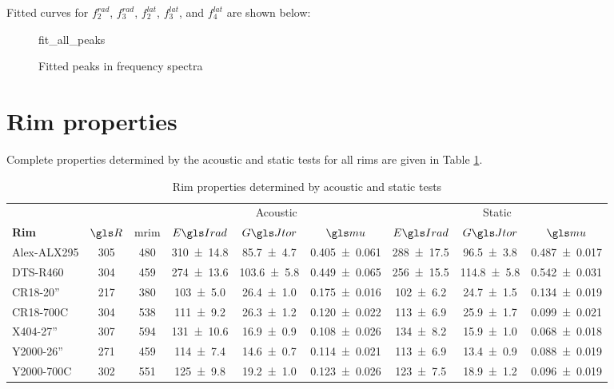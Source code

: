 \documentclass[../../thesis.tex]{subfiles}
\begin{document}
Fitted curves for $f_2^{rad}$, $f_3^{rad}$, $f_2^{lat}$, $f_3^{lat}$, and $f_4^{lat}$ are shown below:

\begin{figure}
\centering
{fit_all_peaks}
\caption{Fitted peaks in frequency spectra}
\label{fig:ema_all_peaks}
\end{figure}


\section{Rim properties}
\label{app:acoustic_properties}

Complete properties determined by the acoustic and static tests for all rims are given in Table \ref{tab:acoustic_properties}.

\begin{table}
\small
\caption{Rim properties determined by acoustic and static tests}
\label{tab:acoustic_properties}
\begin{tabular}{lcc|ccc|ccc}
\hline
&&&\multicolumn{3}{c|}{Acoustic} & \multicolumn{3}{c}{Static}\\
\bf{Rim}     & $\R$ & \gls{mrim} & $\EIr$ & $\GJ$ & $\m$ & $\EIr$ & $\GJ$ & $\m$\\
\hline
Alex-ALX295 & 305 & 480 & \num{310 +- 14.8} & \num{ 85.7 +- 4.7} & \num{0.405 +- 0.061} &
                          \num{288 +- 17.5} & \num{ 96.5 +- 3.8} & \num{0.487 +- 0.017}\\
DTS-R460    & 304 & 459 & \num{274 +- 13.6} & \num{103.6 +- 5.8} & \num{0.449 +- 0.065} &
                          \num{256 +- 15.5} & \num{114.8 +- 5.8} & \num{0.542 +- 0.031}\\
CR18-20''   & 217 & 380 & \num{103 +-  5.0} & \num{ 26.4 +- 1.0} & \num{0.175 +- 0.016} &
                          \num{102 +-  6.2} & \num{ 24.7 +- 1.5} & \num{0.134 +- 0.019}\\
CR18-700C   & 304 & 538 & \num{111 +-  9.2} & \num{ 26.3 +- 1.2} & \num{0.120 +- 0.022} &
                          \num{113 +-  6.9} & \num{ 25.9 +- 1.7} & \num{0.099 +- 0.021}\\
X404-27''   & 307 & 594 & \num{131 +- 10.6} & \num{ 16.9 +- 0.9} & \num{0.108 +- 0.026} &
                          \num{134 +-  8.2} & \num{ 15.9 +- 1.0} & \num{0.068 +- 0.018}\\
Y2000-26''  & 271 & 459 & \num{114 +-  7.4} & \num{ 14.6 +- 0.7} & \num{0.114 +- 0.021} &
                          \num{113 +-  6.9} & \num{ 13.4 +- 0.9} & \num{0.088 +- 0.019}\\
Y2000-700C  & 302 & 551 & \num{125 +-  9.8} & \num{ 19.2 +- 1.0} & \num{0.123 +- 0.026} &
                          \num{123 +-  7.5} & \num{ 18.9 +- 1.2} & \num{0.096 +- 0.019}\\
\hline
\end{tabular}
\end{table}
\end{document}
